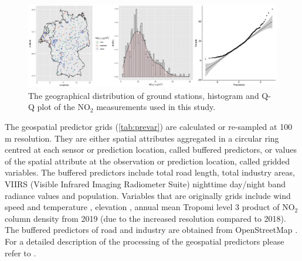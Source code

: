 \documentclass{article}
\begin{document}
\begin{figure}
    \centering
    \includegraphics[scale=0.06]{fig/histqq_NO2.png}
    \caption{The geographical distribution of ground stations, histogram and Q-Q plot of the NO$_2$ measurements used in this study.}
    \label{fig:histqq}
\end{figure}{}

The geospatial predictor grids (\cref{tab:prevar}) are calculated or re-sampled at 100 m resolution. They are either spatial attributes aggregated in a circular ring centred at each sensor or prediction location, called buffered predictors, or values of the spatial attribute at the observation or prediction location, called gridded variables. The buffered predictors include total road length, total industry areas, VIIRS (Visible Infrared Imaging Radiometer Suite) nighttime day/night band radiance values \citep[nightlight,][]{nightlight} and population. Variables that are originally grids include wind speed and temperature \citep{dee2011era}, elevation \citep{elevation}, annual mean Tropomi level 3 product of NO$_2$ column density  \citep{TROPOMIgee} from 2019 (due to the increased resolution compared to 2018). The buffered predictors of road and industry are obtained from OpenStreetMap  \citep{openstreetmap}. For a detailed description of the processing of the geospatial predictors please refer to \cite{luglobal}.   
\end{document}
